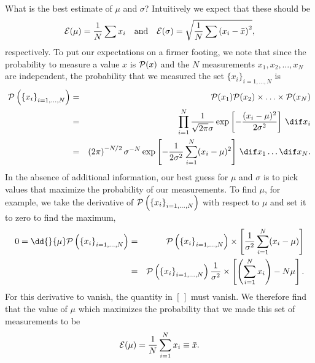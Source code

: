   What is the best estimate of $\mu$ and $\sigma$?  Intuitively we expect that these should be
\[
	\mathcal{E}(\mu) = \frac{1}{N}\sum x_{i}\quad\textrm{and}\quad\mathcal{E}(\sigma) = \sqrt{\frac{1}{N}\sum\left(x_{i}-\bar{x}\right)^{2}},
\]
respectively. To put our expectations on a firmer footing, we note that since the probability to measure a value $x$ is $\mathcal{P}(x)$ and the $N$ measurements $x_{1}, x_{2}, \ldots, x_{N}$ are independent, the  probability that we measured the set $\{x_{i}\}_{i=1,\ldots,N}$ is
\begin{eqnarray*}
	\prob\left(\left\{x_{i}\right\}_{i=1,\ldots,N}\right) &=& \prob(x_{1})\prob(x_{2})\times\ldots\times\prob(x_{N})\\	
	&=& \prod_{i=1}^{N}\frac{1}{\sqrt{2\pi}\sigma}\exp\left[-\frac{(x_{i}-\mu)^{2}}{2\sigma^{2}}\right]\,\dif x_{i}\\
	&=& \left(2\pi\right)^{-N/2}\sigma^{-N}\exp\left[-\frac{1}{2\sigma^{2}}\sum_{i=1}^{N}(x_{i}-\mu)^{2}\right]\,\dif x_{1}\ldots\dif x_{N}.
\end{eqnarray*}
In the absence of additional information, our best guess for $\mu$ and $\sigma$ is to pick values that maximize the probability of our measurements.  To find $\mu$, for example, we take the derivative of $\mathcal{P}\left(\left\{x_{i}\right\}_{i=1,\ldots,N}\right)$ with respect to $\mu$ and set it to zero to find the maximum,
\begin{eqnarray*}
	0 = \dd{}{\mu}\prob\left(\left\{x_{i}\right\}_{i=1,\ldots,N}\right) &=& \prob\left(\left\{x_{i}\right\}_{i=1,\ldots,N}\right)\times\left[\frac{1}{\sigma^{2}}\sum_{i=1}^{N}(x_{i}-\mu)\right]\\
	&=& \prob\left(\left\{x_{i}\right\}_{i=1,\ldots,N}\right)\frac{1}{\sigma^{2}}\times
		\left[\left(\sum_{i=1}^{N}x_{i}\right) - N\mu\right].
\end{eqnarray*}
For this derivative to vanish, the quantity in $\left[\,\right]$ must vanish.
We therefore find that the value of $\mu$ which maximizes the probability that we made this set of measurements to be
\begin{equation}
	\mathcal{E}(\mu) = \frac{1}{N}\sum_{i=1}^{N}x_{i} \equiv \bar{x}.
\end{equation}
